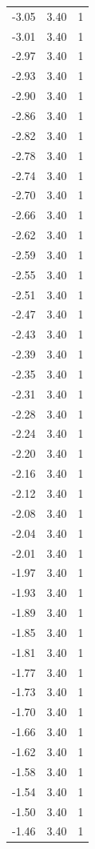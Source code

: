 \begin{longtable}{lrr}
  -3.05 & 3.40 & 1 \\
  -3.01 & 3.40 & 1 \\
  -2.97 & 3.40 & 1 \\
  -2.93 & 3.40 & 1 \\
  -2.90 & 3.40 & 1 \\
  -2.86 & 3.40 & 1 \\
  -2.82 & 3.40 & 1 \\
  -2.78 & 3.40 & 1 \\
  -2.74 & 3.40 & 1 \\
  -2.70 & 3.40 & 1 \\
  -2.66 & 3.40 & 1 \\
  -2.62 & 3.40 & 1 \\
  -2.59 & 3.40 & 1 \\
  -2.55 & 3.40 & 1 \\
  -2.51 & 3.40 & 1 \\
  -2.47 & 3.40 & 1 \\
  -2.43 & 3.40 & 1 \\
  -2.39 & 3.40 & 1 \\
  -2.35 & 3.40 & 1 \\
  -2.31 & 3.40 & 1 \\
  -2.28 & 3.40 & 1 \\
  -2.24 & 3.40 & 1 \\
  -2.20 & 3.40 & 1 \\
  -2.16 & 3.40 & 1 \\
  -2.12 & 3.40 & 1 \\
  -2.08 & 3.40 & 1 \\
  -2.04 & 3.40 & 1 \\
  -2.01 & 3.40 & 1 \\
  -1.97 & 3.40 & 1 \\
  -1.93 & 3.40 & 1 \\
  -1.89 & 3.40 & 1 \\
  -1.85 & 3.40 & 1 \\
  -1.81 & 3.40 & 1 \\
  -1.77 & 3.40 & 1 \\
  -1.73 & 3.40 & 1 \\
  -1.70 & 3.40 & 1 \\
  -1.66 & 3.40 & 1 \\
  -1.62 & 3.40 & 1 \\
  -1.58 & 3.40 & 1 \\
  -1.54 & 3.40 & 1 \\
  -1.50 & 3.40 & 1 \\
  -1.46 & 3.40 & 1 \\

\end{longtable}
